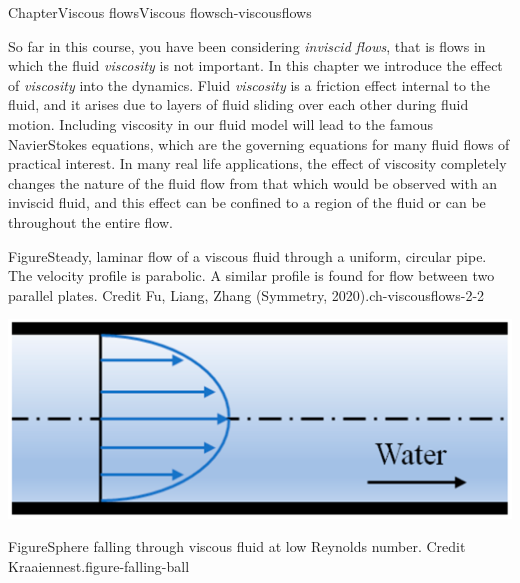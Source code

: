 \documentclass[oneside,10pt,]{book}
\numberwithin{equation}{section}
\begin{document}
\begin{chapterptx}{Chapter}{Viscous flows}{}{Viscous flows}{}{}{ch-viscousflows}
\renewcommand*{\chaptername}{Chapter}
\begin{introduction}{}%
So far in this course, you have been considering \emph{inviscid flows}, that is flows in which the fluid \emph{viscosity} is not important. In this chapter we introduce the effect of \emph{viscosity} into the dynamics. Fluid \emph{viscosity} is a friction effect internal to the fluid, and it arises due to layers of fluid sliding over each other during fluid motion. Including viscosity in our fluid model will lead to the famous Navier\textendash{}Stokes equations, which are the governing equations for many fluid flows of practical interest. In many real life applications, the effect of viscosity completely changes the nature of the fluid flow from that which would be observed with an inviscid fluid, and this effect can be confined to a region of the fluid or can be throughout the entire flow.%
\begin{figureptx}{Figure}{Steady, laminar flow of a viscous fluid through a uniform, circular pipe. The velocity profile is parabolic. A similar profile is found for flow between two parallel plates. Credit Fu, Liang, Zhang (Symmetry, 2020).}{ch-viscousflows-2-2}{}%
\begin{image}{0.2}{0.6}{0.2}{}%
\includegraphics[width=\linewidth]{external/ch-chapter07-Fu-Liang-Zhang-Symmetry-2020-12-00846-g001a-crop.png}
\end{image}%
\tcblower
\end{figureptx}%
\begin{sidebyside}{2}{0}{0}{0}%
\begin{sbspanel}{0.5}%
\begin{panelfigureptx}{Figure}{Sphere falling through viscous fluid at low Reynolds number. Credit Kraaiennest.}{figure-falling-ball}{}%

\end{panelfigureptx}
\end{sbspanel}
\end{sidebyside}
\end{introduction}
\end{chapterptx}
\end{document}
